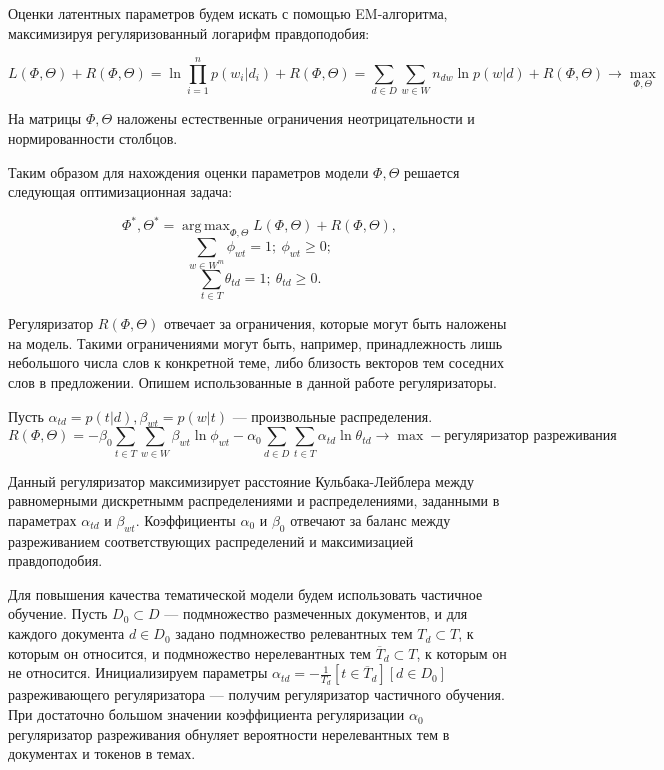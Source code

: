 \documentclass[pdftex,ptm,12pt,a4paper]{report}
\theoremstyle{definition}
\DeclareMathOperator*{\argmax}{arg\,max}
\begin{document}
Оценки латентных параметров будем искать с помощью EM-алгоритма, максимизируя регуляризованный \cite{Vorontsov2015} логарифм правдоподобия:

\[ L(\Phi, \Theta) + R(\Phi, \Theta) = \ln \prod_{i = 1}^{n}p(w_i|d_i) + R(\Phi, \Theta) = \sum_{d\in D}\sum_{w\in W}n_{dw}\ln p(w|d) + R(\Phi, \Theta) \rightarrow  \max_{\Phi, \Theta} \]

На матрицы $\Phi, \Theta$ наложены естественные ограничения неотрицательности и нормированности столбцов.

Таким образом для нахождения оценки параметров модели $\Phi, \Theta$ решается следующая оптимизационная задача:

\[\Phi^{*}, \Theta^{*} = \argmax_{\Phi, \Theta} L(\Phi, \Theta ) + R(\Phi, \Theta) ,\]
\[
\sum_{w\in W^{m}} \phi_{wt} = 1;~ \phi_{wt} \geq 0; 
\]
\[
\sum_{t\in T} \theta_{td} = 1;~ \theta_{td} \geq 0. 
\]

Регуляризатор $R(\Phi, \Theta)$ отвечает за ограничения, которые могут быть наложены на модель. Такими ограничениями могут быть, например, принадлежность лишь небольшого числа слов к конкретной теме, либо близость векторов тем соседних слов в предложении. Опишем использованные в данной работе регуляризаторы.

Пусть $\alpha_{td} = p(t|d), \beta_{wt} = p(w|t)$ --- произвольные распределения.
\[R(\Phi, \Theta) = -\beta_0\sum_{t \in T}\sum_{w\in W}\beta_{wt}\ln\phi_{wt} - \alpha_0\sum_{d \in D}\sum_{t\in T}\alpha_{td}\ln\theta_{td} \rightarrow \max - \text{регуляризатор разреживания} \]

Данный регуляризатор максимизирует расстояние Кульбака-Лейблера между равномерными дискретнымм распределениями и распределениями, заданными в параметрах $\alpha_{td}$ и $\beta_{wt}$. Коэффициенты $\alpha_0$ и $\beta_0$ отвечают за баланс между разреживанием соответствующих распределений и максимизацией правдоподобия.

Для повышения качества тематической модели будем использовать частичное обучение.
Пусть $D_0 \subset D$ --- подмножество размеченных документов, и для каждого документа $d \in D_0$ задано подмножество релевантных тем $T_d \subset T$, к которым он относится,
и подмножество нерелевантных тем $\overline{T}_d \subset T$, к которым он не относится. 
Инициализируем параметры $\alpha_{td} = -\frac{1}{T_d}[t \in \overline{T}_d][d \in D_0]$ разреживающего регуляризатора --- получим регуляризатор частичного обучения. При достаточно большом значении коэффициента регуляризации $\alpha_0$ регуляризатор разреживания обнуляет вероятности нерелевантных тем в документах и токенов в темах. 
\end{document}
